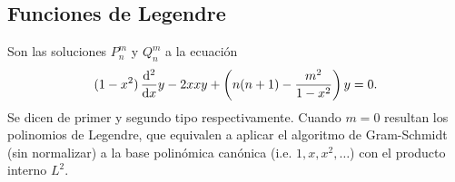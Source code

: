 \documentclass[11pt]{article}
\numberwithin{equation}{section}
\let\d\relax
\newcommand{\d}[1]{\,\frac{\mathrm{d}}{\mathrm{d}#1}}
\newcommand{\dd}[1]{\,\frac{\mathrm{d}^2}{\mathrm{d}#1}}
\begin{document}
\subsection{Funciones de Legendre}
\label{ap:funciones especiales:legendre}

Son las soluciones \(P_n^m\) y \(Q_n^m\) a la ecuación
\begin{displaymath}
\label{eq:legendre}
	(1-x^2) \dd{x} y - 2 x \d{x} y + \left(n(n+1) - \frac{m^2}{1-x^2}\right) y
	= 0.
\end{displaymath}
Se dicen de primer y segundo tipo respectivamente. Cuando \(m=0\) resultan los
polinomios de Legendre, que equivalen a aplicar el algoritmo de Gram-Schmidt
(sin normalizar) a la base polinómica canónica (i.e. \(1, x, x^2, \dots\)) con
el producto interno \(L^2\).
\end{document}
